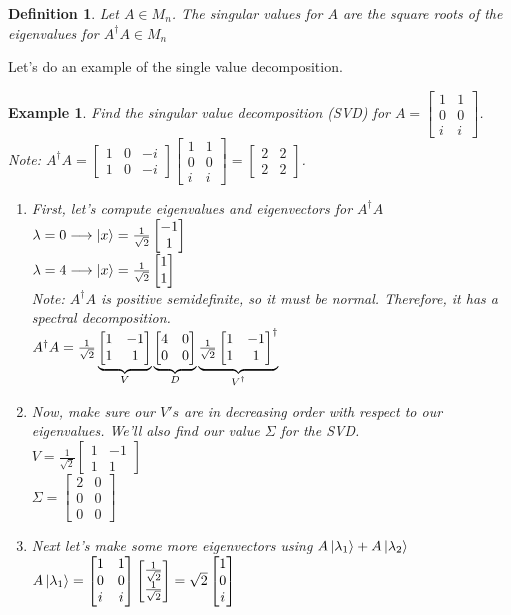 \documentclass[12pt]{article}
\theoremstyle{plain}
\theoremstyle{nonumberplain}
\theoremstyle{plain}
\newtheorem{definition}[lemma]{Definition}
\newtheorem{example}[lemma]{Example}
\theoremstyle{nonumberplain}
\newcommand\1{{\bf 1}}
\newcommand{\bmat}[1]{\begin{bmatrix*} #1 \end{bmatrix*}} %
\newcommand{\<}{\left\langle}
\renewcommand{\>}{\right\rangle}
\begin{document}
\begin{definition}
Let $A\in M_n$. The singular values for $A$ are the square roots of the eigenvalues for $A^\dagger A\in M_n$
\end{definition}
Let's do an example of the single value decomposition.
\begin{example} Find the singular value decomposition (SVD) for $A=\bmat{1 & 1 \\ 0 & 0 \\ i & i}$. \\
Note: $A^\dagger A=\bmat{1 & 0 & -i \\ 1 & 0 & -i}\bmat{1 & 1 \\ 0 & 0 \\ i & i}=\bmat{2 & 2 \\ 2 & 2}$.
\begin{enumerate}
\item First, let's compute eigenvalues and eigenvectors for $A^\dagger A$ \\
$\lambda=0\longrightarrow\ket{x}=\frac{1}{\sqrt{2}}\bmat{-1 \\ 1}$ \\
$\lambda=4\longrightarrow\ket{x}=\frac{1}{\sqrt{2}}\bmat{1 \\ 1}$ \\
Note: $A^\dagger A$ is positive semidefinite, so it must be normal. Therefore, it has a spectral decomposition. \\
$A^\dagger A=\frac{1}{\sqrt{2}}\underbrace{\textstyle \bmat{1 & -1 \\ 1 & 1}}_{\mathclap{V}}\underbrace{\textstyle \bmat{4 & 0 \\ 0 & 0}}_{\mathclap{D}}\underbrace{\textstyle \frac{1}{\sqrt{2}}\bmat{1 & -1 \\ 1 & 1}^\dagger}_{\mathclap{V^\dagger}}$
\item Now, make sure our $V's$ are in decreasing order with respect to our eigenvalues. We'll also find our value $\Sigma$ for the SVD. \\
$V=\frac{1}{\sqrt{2}}\bmat{1 & -1 \\ 1 & 1}$ \\
$\Sigma=\bmat{2 & 0 \\ 0 & 0 \\ 0 & 0}$
\item Next let's make some more eigenvectors using $A\ket{\lambda_1}+A\ket{\lambda_2}$ \\
$A\ket{\lambda_1}=\bmat{1 & 1 \\ 0 & 0 \\ i & i}\bmat{\frac{1}{\sqrt{2}} \\ \frac{1}{\sqrt{2}}}=\sqrt{2}\bmat{1 \\ 0 \\ i}$ \\

\end{enumerate}
\end{example}
\end{document}
